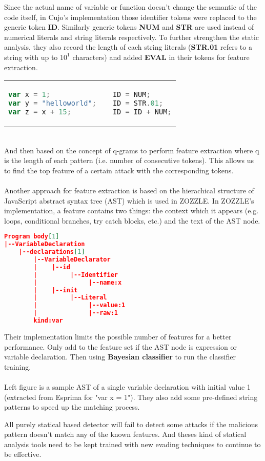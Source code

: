 \documentclass[11pt]{article}
\begin{document}
\newpage
\noindent Since the actual name of variable or function doesn't change the semantic of the code itself, in Cujo\cite{Cujo}'s implementation those identifier tokens were replaced to the generic token \textbf{ID}. Similarly generic tokens \textbf{NUM} and \textbf{STR} are used instead of numerical literals and string literals respectively. To further strengthen the static analysis, they also record the length of each string literals (\textbf{STR.01} refers to a string with up to $10^1$ characters) and added \textbf{EVAL} in their tokens for feature extraction.   \\ 
\begin{tabular}{p{7cm}p{0.5cm}p{7cm}}
			\begin{lstlisting}[language=JavaScript, title=(original code)]
var x = 1;
var y = "helloworld";
var z = x + 15;
			\end{lstlisting} & & \begin{lstlisting}[language=JavaScript, title=(Cujo's implementation)]
ID = NUM;
ID = STR.01;
ID = ID + NUM;
			\end{lstlisting} 
	\end{tabular}  	 		
\\ 
And then based on the concept of q-grams to perform feature extraction where q is the length of each pattern (i.e. number of consecutive tokens). This allows us to find the top feature of a certain attack with the corresponding tokens.\\
\\
Another approach for feature extraction is based on the hierachical structure of JavaScript abstract syntax tree (AST) which is used in ZOZZLE\cite{ZOZZLE}. In ZOZZLE's implementation, a feature contains two things: the context which it appears (e.g. loops, conditional branches, try catch blocks, etc.) and the text of the AST node. 
\begin{multicols}{2}
\begin{lstlisting}[language=json,title=(AST from Esprima)]
Program body[1]
|--VariableDeclaration
    |--declarations[1]
		|--VariableDeclarator
		|	 |--id
		|		  |--Identifier
		|			   |--name:x
		|	 |--init
		|		  |--Literal
		|			   |--value:1
		|			   |--raw:1
		kind:var
	\end{lstlisting} 
Their implementation limits the possible number of features for a better performance. Only add to the feature set if the AST node is expression or variable declaration. Then using \textbf{Bayesian classifier} to run the classifier training.\\ \\ 
Left figure is a sample AST of a single variable declaration with initial value 1 (extracted from Esprima for "var x = 1"). They also add some pre-defined string patterns to speed up the matching process.
\end{multicols}
\noindent All purely statical based detector will fail to detect some attacks if the malicious pattern doesn't match any of the known features. And theses kind of statical analysis tools need to be kept trained with new evading techniques to continue to be effective.
\newpage
\end{document}
